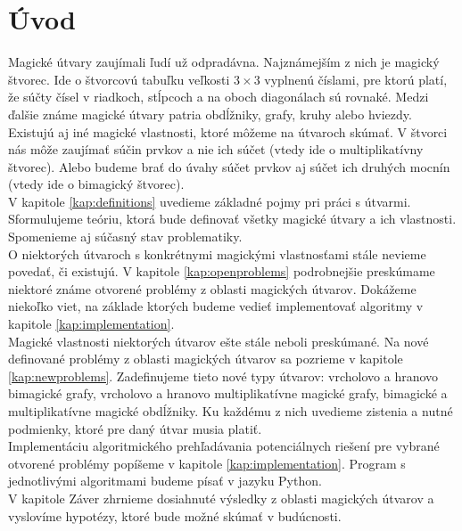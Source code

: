 \chapter*{Úvod} %

Magické útvary zaujímali ľudí už odpradávna. Najznámejším z nich je magický štvorec. Ide o štvorcovú tabuľku veľkosti $3 \times 3$ vyplnenú číslami, pre ktorú platí, že súčty čísel v riadkoch, stĺpcoch a na oboch diagonálach sú rovnaké. Medzi ďalšie známe magické útvary patria obdĺžniky, grafy, kruhy alebo hviezdy. \\

Existujú aj iné magické vlastnosti, ktoré môžeme na útvaroch skúmať. V štvorci nás môže zaujímať súčin prvkov a nie ich súčet (vtedy ide o multiplikatívny štvorec). Alebo budeme brať do úvahy súčet prvkov aj súčet ich druhých mocnín (vtedy ide o bimagický štvorec). \\

V kapitole \ref{kap:definitions} uvedieme základné pojmy pri práci s útvarmi. Sformulujeme teóriu, ktorá bude definovať všetky magické útvary a ich vlastnosti. Spomenieme aj súčasný stav problematiky. \\

O niektorých útvaroch s konkrétnymi magickými vlastnosťami stále nevieme povedať, či existujú. V kapitole \ref{kap:openproblems} podrobnejšie preskúmame niektoré známe otvorené problémy z oblasti magických útvarov. Dokážeme niekoľko viet, na základe ktorých budeme vedieť implementovať algoritmy v kapitole \ref{kap:implementation}. \\

Magické vlastnosti niektorých útvarov ešte stále neboli preskúmané. Na nové definované problémy z oblasti magických útvarov sa pozrieme v kapitole \ref{kap:newproblems}. Zadefinujeme tieto nové typy útvarov: vrcholovo a hranovo bimagické grafy, vrcholovo a hranovo multiplikatívne magické grafy, bimagické a multiplikatívne magické obdĺžniky. Ku každému z nich uvedieme zistenia a nutné podmienky, ktoré pre daný útvar musia platiť. \\

Implementáciu algoritmického prehľadávania potenciálnych riešení pre vybrané otvorené problémy popíšeme v kapitole \ref{kap:implementation}. Program s jednotlivými algoritmami budeme písať v jazyku Python. \\

V kapitole Záver zhrnieme dosiahnuté výsledky z oblasti magických útvarov a vyslovíme hypotézy, ktoré bude možné skúmať v budúcnosti.
